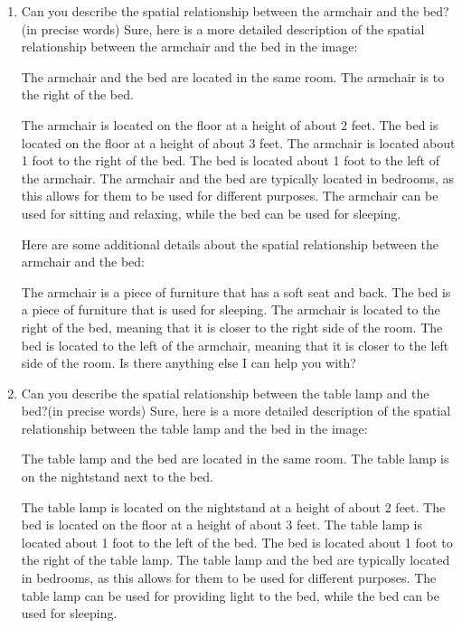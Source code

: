 \begin{enumerate}
    \item Can you describe the spatial relationship between the armchair and the bed?(in precise words)
    \subitem Sure, here is a more detailed description of the spatial relationship between the armchair and the bed in the image:

    The armchair and the bed are located in the same room. The armchair is to the right of the bed.
    
    The armchair is located on the floor at a height of about 2 feet.
    The bed is located on the floor at a height of about 3 feet.
    The armchair is located about 1 foot to the right of the bed.
    The bed is located about 1 foot to the left of the armchair.
    The armchair and the bed are typically located in bedrooms, as this allows for them to be used for different purposes. The armchair can be used for sitting and relaxing, while the bed can be used for sleeping.
    
    Here are some additional details about the spatial relationship between the armchair and the bed:
    
    The armchair is a piece of furniture that has a soft seat and back.
    The bed is a piece of furniture that is used for sleeping.
    The armchair is located to the right of the bed, meaning that it is closer to the right side of the room.
    The bed is located to the left of the armchair, meaning that it is closer to the left side of the room.
    Is there anything else I can help you with?
    \item Can you describe the spatial relationship between the table lamp and the bed?(in precise words)
    \subitem 
    Sure, here is a more detailed description of the spatial relationship between the table lamp and the bed in the image:
    
    The table lamp and the bed are located in the same room. The table lamp is on the nightstand next to the bed.
    
    The table lamp is located on the nightstand at a height of about 2 feet.
    The bed is located on the floor at a height of about 3 feet.
    The table lamp is located about 1 foot to the left of the bed.
    The bed is located about 1 foot to the right of the table lamp.
    The table lamp and the bed are typically located in bedrooms, as this allows for them to be used for different purposes. The table lamp can be used for providing light to the bed, while the bed can be used for sleeping.
    

\end{enumerate}
